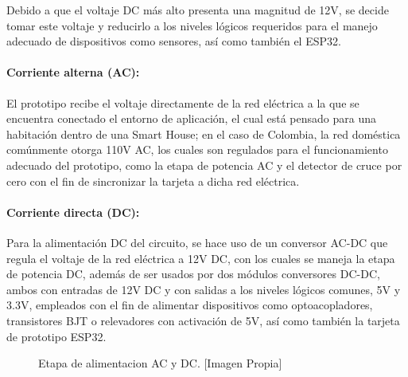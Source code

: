 	Debido a que el voltaje DC más alto presenta una magnitud de 12V, se decide tomar este voltaje y reducirlo a los niveles lógicos requeridos para el manejo adecuado de dispositivos como sensores, así como también el ESP32. \\
	
	\paragraph{Corriente alterna (AC):}
		El prototipo recibe el voltaje directamente de la red eléctrica a la que se encuentra conectado el entorno de aplicación, el cual está pensado para una habitación dentro de una Smart House; en el caso de Colombia, la red doméstica comúnmente otorga 110V AC, los cuales son regulados para el funcionamiento adecuado del prototipo, como la etapa de potencia AC y el detector de cruce por cero con el fin de sincronizar la tarjeta a dicha red eléctrica.\\
	
	\paragraph{Corriente directa (DC):}
	Para la alimentación DC del circuito, se hace uso de un conversor AC-DC que regula el voltaje de la red eléctrica a 12V DC, con los cuales se maneja la etapa de potencia DC, además de ser usados por dos módulos conversores DC-DC, ambos con entradas de 12V DC y con salidas a los niveles lógicos comunes, 5V y 3.3V, empleados con el fin de alimentar dispositivos como optoacopladores, transistores BJT o relevadores con activación de 5V, así como también la tarjeta de prototipo ESP32.\\
	
		\begin{figure}[!t]
			\centering
			\caption[Etapa de alimentacion AC y DC.]{Etapa de alimentacion AC y DC. [Imagen Propia]}
			\label{fig:balidc}
		\end{figure}
		
